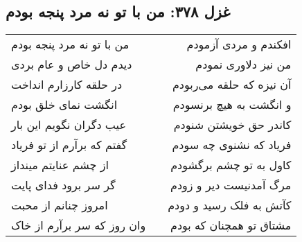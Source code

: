 \begin{center}
\section*{غزل ۳۷۸: من با تو نه مرد پنجه بودم}
\label{sec:378}
\begin{longtable}{l p{0.5cm} r}
من با تو نه مرد پنجه بودم
&&
افکندم و مردی آزمودم
\\
دیدم دل خاص و عام بردی
&&
من نیز دلاوری نمودم
\\
در حلقه کارزارم انداخت
&&
آن نیزه که حلقه می‌ربودم
\\
انگشت نمای خلق بودم
&&
و انگشت به هیچ برنسودم
\\
عیب دگران نگویم این بار
&&
کاندر حق خویشتن شنودم
\\
گفتم که برآرم از تو فریاد
&&
فریاد که نشنوی چه سودم
\\
از چشم عنایتم مینداز
&&
کاول به تو چشم برگشودم
\\
گر سر برود فدای پایت
&&
مرگ آمدنیست دیر و زودم
\\
امروز چنانم از محبت
&&
کآتش به فلک رسید و دودم
\\
وان روز که سر برآرم از خاک
&&
مشتاق تو همچنان که بودم
\\
\end{longtable}
\end{center}
